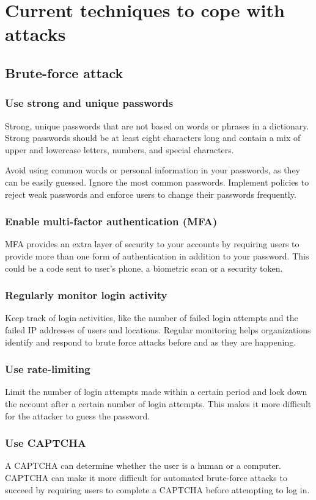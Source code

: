 \documentclass{ijitcs}
\begin{document}
\section{Current techniques to cope with attacks}
\subsection{Brute-force attack}
\subsubsection
{Use strong and unique passwords}
Strong, unique passwords that are not based on words or phrases in a dictionary. Strong passwords should be at least eight characters long and contain a mix of upper and lowercase letters, numbers, and special characters.

Avoid using common words or personal information in your passwords, as they can be easily guessed.
Ignore the most common passwords.  
Implement policies to reject weak passwords and enforce users to change their passwords frequently.
\subsubsection{Enable multi-factor authentication (MFA)}
MFA provides an extra layer of security to your accounts by requiring users to provide more than one form of authentication in addition to your password. This could be a code sent to user's phone, a biometric scan or a security token.
\subsubsection{Regularly monitor login activity}
Keep track of login activities, like the number of failed login attempts and the failed IP addresses of users and locations. Regular monitoring helps organizations identify and respond to brute force attacks before and as they are happening.
\subsubsection{Use rate-limiting}
Limit the number of login attempts made within a certain period and lock down the account after a certain number of login attempts. This makes it more difficult for the attacker to guess the password.
\subsubsection{Use CAPTCHA}
A CAPTCHA can determine whether the user is a human or a computer. CAPTCHA can make it more difficult for automated brute-force attacks to succeed by requiring users to complete a CAPTCHA before attempting to log in.
\end{document}
